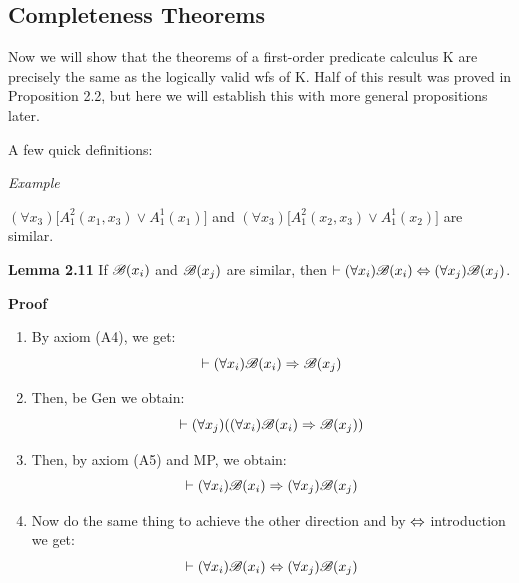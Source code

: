 \subsection{Completeness Theorems}

Now we will show that the theorems of a first-order predicate calculus K are precisely the same as the logically valid wfs of K. Half of this result was proved in Proposition 2.2, but here we will establish this with more general propositions later.

A few quick definitions:


\textit{Example} 
\begin{center}
$(\forall x_3)\big[ A_1^2(x_1,x_3) \lor A_1^1(x_1) \big]$ and $(\forall x_3) \big[A_1^2(x_2, x_3) \lor A_1^1(x_2) \big]$ are similar.
\end{center} 

\textbf{Lemma 2.11}
If $\mathscr{B}(x_i)$ and $\mathscr{B}(x_j)$ are similar, then $\vdash (\forall x_i)\mathscr{B}(x_i) \Leftrightarrow (\forall x_j) \mathscr{B}(x_j)$. 

\textbf{Proof}
\begin{enumerate}
    \item By axiom (A4), we get:
    \[\vdash (\forall x_i) \mathscr{B}(x_i) \Rightarrow \mathscr{B}(x_j) \]
    \item Then, be Gen we obtain:
    \[\vdash (\forall x_j)((\forall x_i)\mathscr{B}(x_i) \Rightarrow \mathscr{B}(x_j))\]
    \item Then, by axiom (A5) and MP, we obtain:
    \[\vdash (\forall x_i) \mathscr{B}(x_i) \Rightarrow (\forall x_j) \mathscr{B}(x_j)\]
    \item Now do the same thing to achieve the other direction and by $\Leftrightarrow$ introduction we get:
    \[\vdash (\forall x_i) \mathscr{B}(x_i) \Leftrightarrow (\forall x_j) \mathscr{B}(x_j)\]
\end{enumerate}


